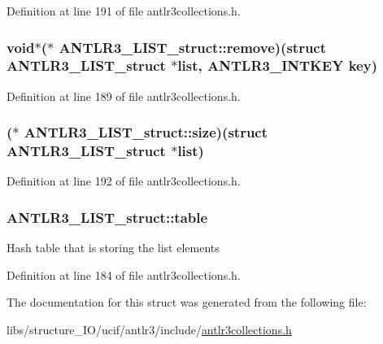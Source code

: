 Definition at line 191 of file antlr3collections.\-h.

\hypertarget{struct_a_n_t_l_r3___l_i_s_t__struct_a6055530ad64fac8d110fd3ea3c5b9f9b}{
\subsubsection[{remove}]{\setlength{\rightskip}{0pt plus 5cm}void$\ast$($\ast$ A\-N\-T\-L\-R3\-\_\-\-L\-I\-S\-T\-\_\-struct\-::remove)(struct {\bf A\-N\-T\-L\-R3\-\_\-\-L\-I\-S\-T\-\_\-struct} $\ast$list, {\bf A\-N\-T\-L\-R3\-\_\-\-I\-N\-T\-K\-E\-Y} key)}}\label{struct_a_n_t_l_r3___l_i_s_t__struct_a6055530ad64fac8d110fd3ea3c5b9f9b}


Definition at line 189 of file antlr3collections.\-h.

\hypertarget{struct_a_n_t_l_r3___l_i_s_t__struct_adbf6732ad9cc35ad516fb8bd24eb21a4}{
\subsubsection[{size}]{($\ast$ A\-N\-T\-L\-R3\-\_\-\-L\-I\-S\-T\-\_\-struct\-::size)(struct {\bf A\-N\-T\-L\-R3\-\_\-\-L\-I\-S\-T\-\_\-struct} $\ast$list)}}\label{struct_a_n_t_l_r3___l_i_s_t__struct_adbf6732ad9cc35ad516fb8bd24eb21a4}


Definition at line 192 of file antlr3collections.\-h.

\hypertarget{struct_a_n_t_l_r3___l_i_s_t__struct_a15b368e87b7d31281b6f8c45abdbbe49}{
\subsubsection[{table}]{ A\-N\-T\-L\-R3\-\_\-\-L\-I\-S\-T\-\_\-struct\-::table}}\label{struct_a_n_t_l_r3___l_i_s_t__struct_a15b368e87b7d31281b6f8c45abdbbe49}
Hash table that is storing the list elements 

Definition at line 184 of file antlr3collections.\-h.



The documentation for this struct was generated from the following file\-:\begin{DoxyCompactItemize}
\item 
libs/structure\-\_\-\-I\-O/ucif/antlr3/include/\hyperlink{antlr3collections_8h}{antlr3collections.\-h}\end{DoxyCompactItemize}
